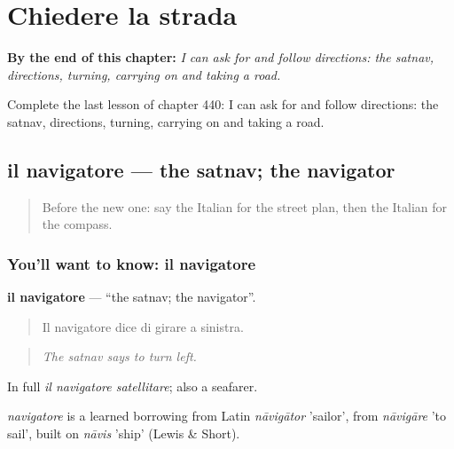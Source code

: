 
\chapter{Chiedere la strada}
\label{ch:it-chiedere-la-strada}

\begin{chapteropening}
\textbf{By the end of this chapter:} \emph{I can ask for and follow directions: the satnav, directions, turning, carrying on and taking a road.}

Complete the last lesson of chapter 440: I can ask for and follow directions: the satnav, directions, turning, carrying on and taking a road.
\end{chapteropening}

\section[il navigatore]{il navigatore — the satnav; the navigator}

\label{lesson:IT-C440-navigatore}



\begin{quote}
Before the new one: say the Italian for the street plan, then the Italian for the compass.
\end{quote}

\subsection*{You'll want to know: il navigatore}
\textbf{il navigatore} — \textquotedblleft{}the satnav; the navigator\textquotedblright{}.

\begin{quote}
Il navigatore dice di girare a sinistra.
\end{quote}

\begin{quote}
\emph{The satnav says to turn left.}
\end{quote}

In full \emph{il navigatore satellitare}; also a seafarer.

\begin{cousinweb}
\emph{navigatore} is a learned borrowing from Latin \emph{nāvigātor} 'sailor', from \emph{nāvigāre} 'to sail', built on \emph{nāvis} 'ship' (Lewis \& Short).
\end{cousinweb}

